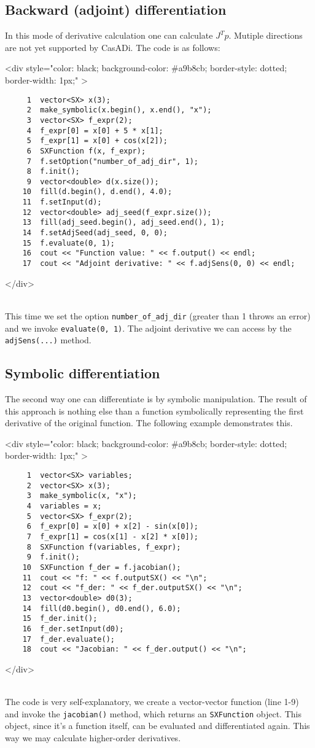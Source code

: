 \documentclass[a4paper,12pt]{book}
\newcommand{\codebegin}{
\begin{rawhtml}
<div style="color: black; background-color: \#a9b8cb;  border-style: dotted; border-width: 1px;" >
\end{rawhtml}
}
\newcommand{\codeend}{
\begin{rawhtml}
</div>
\end{rawhtml}
}
\begin{document}
{\subsection*{Backward (adjoint) differentiation}
In this mode of derivative calculation one can calculate $J^T p$. Mutiple directions are not yet supported by CasADi.
The code is as follows:
\par
\codebegin
\begin{verbatim}
     1  vector<SX> x(3);
     2  make_symbolic(x.begin(), x.end(), "x");
     3  vector<SX> f_expr(2);
     4  f_expr[0] = x[0] + 5 * x[1];
     5  f_expr[1] = x[0] + cos(x[2]);
     6  SXFunction f(x, f_expr);
     7  f.setOption("number_of_adj_dir", 1);
     8  f.init();
     9  vector<double> d(x.size());
    10  fill(d.begin(), d.end(), 4.0);
    11  f.setInput(d);
    12  vector<double> adj_seed(f_expr.size());
    13  fill(adj_seed.begin(), adj_seed.end(), 1);
    14  f.setAdjSeed(adj_seed, 0, 0);
    15  f.evaluate(0, 1);
    16  cout << "Function value: " << f.output() << endl;
    17  cout << "Adjoint derivative: " << f.adjSens(0, 0) << endl;
\end{verbatim}
\codeend\\
This time we set the option \texttt{number\_of\_adj\_dir} (greater than 1 throws an error) and we invoke \texttt{evaluate(0, 1)}.
The adjoint derivative we can access by the \texttt{adjSens(...)} method.
\par
\subsection*{Symbolic differentiation}
The second way one can differentiate is by symbolic manipulation. The result of this approach is nothing else than a
function symbolically representing the first derivative of the original function. The following example demonstrates this.
\par
\codebegin
\begin{verbatim}
     1  vector<SX> variables;
     2  vector<SX> x(3);
     3  make_symbolic(x, "x");
     4  variables = x;
     5  vector<SX> f_expr(2);
     6  f_expr[0] = x[0] + x[2] - sin(x[0]);
     7  f_expr[1] = cos(x[1] - x[2] * x[0]);
     8  SXFunction f(variables, f_expr);
     9  f.init();
    10  SXFunction f_der = f.jacobian();
    11  cout << "f: " << f.outputSX() << "\n"; 
    12  cout << "f_der: " << f_der.outputSX() << "\n";
    13  vector<double> d0(3);
    14  fill(d0.begin(), d0.end(), 6.0);
    15  f_der.init();
    16  f_der.setInput(d0);
    17  f_der.evaluate();
    18  cout << "Jacobian: " << f_der.output() << "\n"; 
\end{verbatim}
\codeend\\
The code is very self-explanatory, we create a vector-vector function (line 1-9) and invoke the \texttt{jacobian()} method, which
returns an \texttt{SXFunction} object. This object, since it's a function itself, can be evaluated and differentiated again.
This way we may calculate higher-order derivatives.
}
\end{document}
